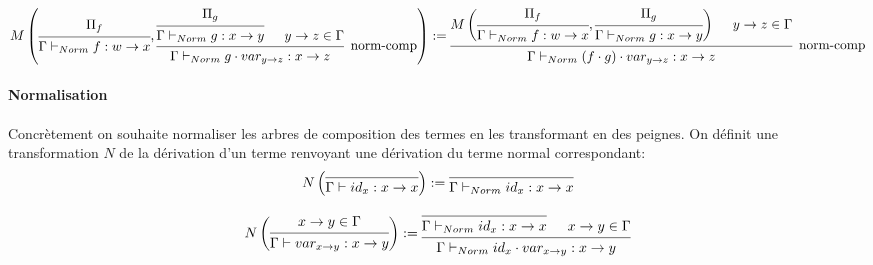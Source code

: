 \documentclass[12pt']{article}
\begin{document}
\begin{equation}
	M \left(
	\begin{prooftree}
		\hypo[]{\Pi_f}
		\infer1[]{\Gamma \vdash_{Norm} f : w \rightarrow x}
	\end{prooftree}
	,
	\begin{prooftree}
		\hypo[]{\Pi_g}
		\infer1[]{\Gamma \vdash_{Norm} g : x \rightarrow y}
		\hypo[]{y \rightarrow z \in \Gamma}
		\infer2[norm-comp]{\Gamma \vdash_{Norm} g \cdot var_{y \rightarrow z} : x \rightarrow z}
	\end{prooftree}
	\right)
	:=
	\begin{prooftree}
		\hypo[]{
			M \left(
			\begin{prooftree}
				\hypo[]{\Pi_f}
				\infer1[]{\Gamma \vdash_{Norm} f : w \rightarrow x}
			\end{prooftree}
			,
			\begin{prooftree}
				\hypo[]{\Pi_g}
				\infer1[]{\Gamma \vdash_{Norm} g : x \rightarrow y}
			\end{prooftree}
			\right)
		}
		\hypo[]{y \rightarrow z \in \Gamma}
		\infer2[norm-comp]{\Gamma \vdash_{Norm} (f \cdot g) \cdot var_{y \rightarrow z} : x \rightarrow z}
	\end{prooftree}
\end{equation}

\paragraph{Normalisation} Concrètement on souhaite normaliser les arbres de composition des termes en les transformant en des peignes. On définit une transformation $N$ de la dérivation d'un terme renvoyant une dérivation du terme normal correspondant:
\begin{equation}
	N \left(
	\begin{prooftree}
		\infer0[]{\Gamma \vdash id_x : x \rightarrow x}
	\end{prooftree}
	\right)
	:=
	\begin{prooftree}
		\infer0[]{\Gamma \vdash_{Norm} id_x : x \rightarrow x}
	\end{prooftree}
\end{equation}

\begin{equation}
	N \left(
	\begin{prooftree}
		\hypo[]{x \rightarrow y \in \Gamma}
		\infer1[]{\Gamma \vdash var_{x \rightarrow y} : x \rightarrow y}
	\end{prooftree}
	\right)
	:=
	\begin{prooftree}
		\infer0[]{\Gamma \vdash_{Norm} id_x : x \rightarrow x}
		\hypo[]{x \rightarrow y \in \Gamma}
		\infer2[]{\Gamma \vdash_{Norm} id_x \cdot var_{x \rightarrow y} : x \rightarrow y}
	\end{prooftree}
\end{equation}
\end{document}
